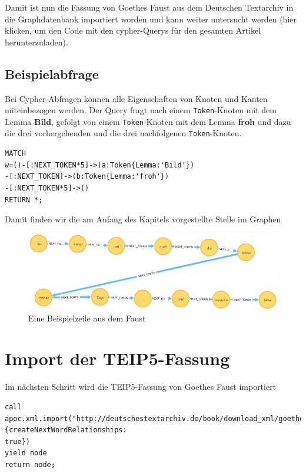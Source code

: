\documentclass[ngerman,]{scrreprt}
\begin{document}
Damit ist nun die Fassung von Goethes Faust aus dem Deutschen Textarchiv in die Graphdatenbank importiert worden und kann weiter untersucht werden (hier klicken, um den Code mit den cypher-Querys für den gesamten Artikel herunterzuladen).

\subsection{Beispielabfrage}\label{beispielabfrage}

Bei Cypher-Abfragen können alle Eigenschaften von Knoten und Kanten miteinbezogen werden. Der Query fragt nach einem \texttt{Token}-Knoten mit dem Lemma \textbf{Bild}, gefolgt von einem \texttt{Token}-Knoten mit dem Lemma \textbf{froh} und dazu die drei vorhergehenden und die drei nachfolgenen \texttt{Token}-Knoten.

\begin{verbatim}
MATCH
w=()-[:NEXT_TOKEN*5]->(a:Token{Lemma:'Bild'})
-[:NEXT_TOKEN]->(b:Token{Lemma:'froh'})
-[:NEXT_TOKEN*5]->()
RETURN *;
\end{verbatim}

Damit finden wir die am Anfang des Kapitels vorgestellte Stelle im Graphen

\begin{figure}
\centering
\includegraphics{Bilder/TEI2Graph/BilderFroherTage.png}
\caption{Eine Beispielzeile aus dem Faust}
\end{figure}

\section{Import der TEIP5-Fassung}\label{import-der-teip5-fassung}

Im nächsten Schritt wird die TEIP5-Fassung von Goethes Faust importiert

\begin{verbatim}
call
apoc.xml.import("http://deutschestextarchiv.de/book/download_xml/goethe_faust01_1808",{createNextWordRelationships:
true})
yield node
return node;
\end{verbatim}
\end{document}
